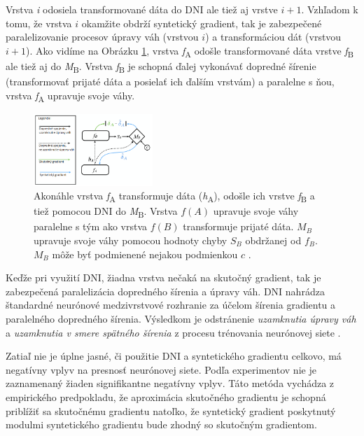 Vrstva \textit{i} odosiela transformované dáta do DNI ale tiež aj vrstve $i+1$. Vzhľadom k tomu, že vrstva $i$ okamžite obdrží syntetický gradient, tak je zabezpečené paralelizovanie procesov úpravy váh (vrstvou $i$) a transformáciou dát (vrstvou $i+1$). Ako vidíme na Obrázku \ref{komunikaciaDNI}, vrstva \textit{f}\textsubscript{A} odošle transformované dáta vrstve \textit{f}\textsubscript{B} ale tiež aj do \textit{M}\textsubscript{B}. Vrstva \textit{f}\textsubscript{B} je schopná ďalej vykonávať dopredné šírenie (transformovať prijaté dáta a posielať ich ďalším vrstvám) a paralelne s ňou, vrstva \textit{f}\textsubscript{A} upravuje svoje váhy.

\begin{figure}
\centerline{\includegraphics[width=0.4\textwidth]{images/DNI}}
\caption[Komunikácia vrstiev s DNI]{Akonáhle vrstva \textit{f}\textsubscript{A} transformuje dáta (\textit{h}\textsubscript{A}), odošle ich vrstve \textit{f}\textsubscript{B} a tiež pomocou DNI do \textit{M}\textsubscript{B}. Vrstva $f(A)$ upravuje svoje váhy paralelne s tým ako vrstva $f(B)$ transformuje prijaté dáta. $M_B$ upravuje svoje váhy pomocou hodnoty chyby $S_B$ obdržanej od $f_B$. $M_B$ môže byť podmienené nejakou podmienkou $c$ \cite{Jaderberg2016}.}
\label{komunikaciaDNI}
\end{figure}

Keďže pri využití DNI, žiadna vrstva nečaká na skutočný gradient, tak je zabezpečená paralelizácia dopredného šírenia a úpravy váh. DNI nahrádza štandardné neurónové medzivrstvové rozhranie za účelom šírenia gradientu a paralelného dopredného šírenia. Výsledkom je odstránenie \textit{uzamknutia úpravy váh} a \textit{uzamknutia v smere spätného šírenia} z procesu trénovania neurónovej siete \cite{Jaderberg2016}.

Zatiaľ nie je úplne jasné, či použitie DNI a syntetického gradientu celkovo, má negatívny vplyv na presnosť neurónovej siete. Podľa experimentov \cite{Jaderberg2016, Czarnecki2017} nie je zaznamenaný žiaden signifikantne negatívny vplyv. Táto metóda vychádza z empirického predpokladu, že aproximácia skutočného gradientu je schopná priblížiť sa skutočnému gradientu natoľko, že syntetický gradient poskytnutý modulmi syntetického gradientu bude zhodný so skutočným gradientom. 

